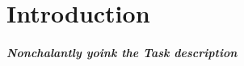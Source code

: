 \documentclass[main.tex]{subfiles}
\begin{document}
\chapter{Introduction}\label{chap:Introduction}

\paragraph*{Nonchalantly yoink the Task description}
\end{document}
